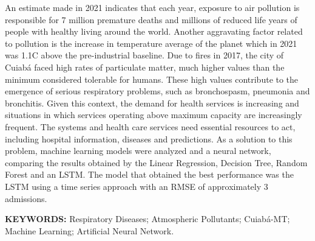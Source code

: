 \documentclass[
  12pt,		%
  a4paper,	%
  openright,%
  oneside,	%
  chapter=TITLE,		%
  section=TITLE,		%
  english,	%
  french,	%
  spanish,	%
  brazil	%
]{abntex2}
\begin{document}
    \begin{resumo}[Abstract] %
    
    An estimate made in 2021 indicates that each year, exposure to air pollution is
    responsible for 7 million premature deaths and millions of reduced life years of people with
    healthy living around the world. Another aggravating factor related to pollution is the increase in temperature
    average of the planet which in 2021 was 1.1\degree C above the pre-industrial baseline. Due to fires in
    2017, the city of Cuiabá faced high rates of particulate matter, much higher values
    than the minimum considered tolerable for humans. These high values contribute to
    the emergence of serious respiratory problems, such as bronchospasm, pneumonia and bronchitis.
    Given this context, the demand for health services is increasing and situations in which
    services operating above maximum capacity are increasingly frequent. The systems and health care services 
    need essential resources to act, including hospital information, diseases and
    predictions. As a solution to this problem, machine learning models were analyzed and
    a neural network, comparing the results obtained by the Linear Regression, Decision Tree, Random Forest
    and an LSTM. The model that obtained the best performance was the LSTM using a
    time series approach with an RMSE of approximately 3 admissions.
        
        \vspace*{0.5cm}
        
        \noindent\textbf{\MakeUppercase{Keywords: }} Respiratory Diseases; Atmospheric Pollutants; Cuiabá-MT;
        Machine Learning; Artificial Neural Network.
    
    \end{resumo}
    
    
    \listoffigures*
    \newpage
    
\end{document}
